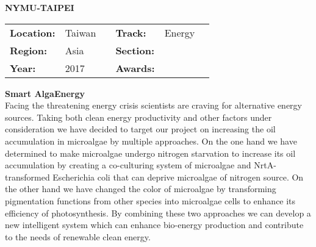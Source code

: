 \textbf{\uppercase{NYMU-Taipei}} \FloatBarrier \begin{table}[h] \begin{tabular}{lp{2.5cm}llll} \textbf{Location:} & Taiwan & \multicolumn{1}{|l}{} & \textbf{Track:}   & Energy \\ \textbf{Region:}   & Asia   & \multicolumn{1}{|l}{} & \textbf{Section:} &  \\ \textbf{Year:}     & 2017   & \multicolumn{1}{|l}{} & \textbf{Awards:}  & \end{tabular} \end{table} \FloatBarrier \noindent\textbf{ Smart AlgaEnergy} \vspace{.2cm}\\
Facing the threatening energy crisis scientists are craving for alternative energy sources. Taking both clean energy productivity and other factors under consideration we have decided to target our project on increasing the oil accumulation in microalgae by multiple approaches. On the one hand we have determined to make microalgae undergo nitrogen starvation to increase its oil accumulation by creating a co-culturing system of microalgae and NrtA-transformed Escherichia coli that can deprive microalgae of nitrogen source. On the other hand we have changed the color of microalgae by transforming pigmentation functions from other species into microalgae cells to enhance its efficiency of photosynthesis. By combining these two approaches we can develop a new intelligent system which can enhance bio-energy production and contribute to the needs of renewable clean energy.
\vspace{2cm} $ $
\pagebreak

